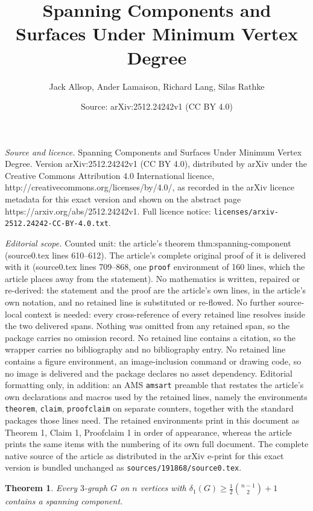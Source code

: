 \documentclass[10pt,a4paper]{amsart}
\title{Spanning Components and Surfaces Under Minimum Vertex Degree}
\author{Jack Allsop, Ander Lamaison, Richard Lang, Silas Rathke}
\date{Source: arXiv:2512.24242v1 (CC BY 4.0)}
\newtheorem{theorem}{Theorem}
\begin{document}
\maketitle

\noindent\emph{Source and licence.} Spanning Components and Surfaces Under Minimum Vertex Degree. Version arXiv:2512.24242v1 (CC BY 4.0), distributed by arXiv under the Creative Commons Attribution 4.0 International licence, http://creativecommons.org/licenses/by/4.0/, as recorded in the arXiv licence metadata for this exact version and shown on the abstract page https://arxiv.org/abs/2512.24242v1. Full licence notice: \texttt{licenses/arxiv-2512.24242-CC-BY-4.0.txt}.\par\smallskip

\noindent\textit{Editorial scope.} Counted unit: the article's theorem thm:spanning-component (source0.tex lines 610--612). The article's complete original proof of it is delivered with it (source0.tex lines 709--868, one \texttt{proof} environment of 160 lines, which the article places away from the statement). No mathematics is written, repaired or re-derived: the statement and the proof are the article's own lines, in the article's own notation, and no retained line is substituted or re-flowed.  No further source-local context is needed: every cross-reference of every retained line resolves inside the two delivered spans.  Nothing was omitted from any retained span, so the package carries no omission record.  No retained line contains a citation, so the wrapper carries no bibliography and no bibliography entry.  No retained line contains a figure environment, an image-inclusion command or drawing code, so no image is delivered and the package declares no asset dependency.  Editorial formatting only, in addition: an AMS \texttt{amsart} preamble that restates the article's own declarations and macros used by the retained lines, namely the environments \texttt{theorem}, \texttt{claim}, \texttt{proofclaim} on separate counters, together with the standard packages those lines need.  The retained environments print in this document as Theorem 1, Claim 1, Proofclaim 1 in order of appearance, whereas the article prints the same items with the numbering of its own full document.  The complete native source of the article as distributed in the arXiv e-print for this exact version is bundled unchanged as \texttt{sources/191868/source0.tex}.
	\begin{theorem}\label{thm:spanning-component}
		Every $3$-graph $G$ on $n$ vertices with $\delta_1(G) \geq \tfrac{1}{2}\binom{n-1}{2}+1$ contains a spanning component.
	\end{theorem}
\end{document}
